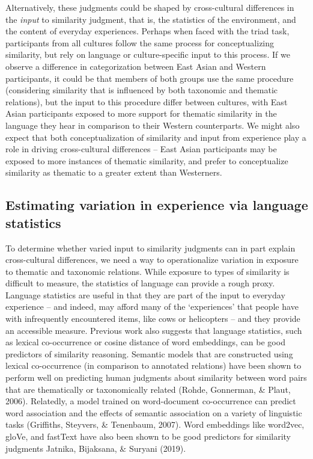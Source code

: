 \documentclass[10pt, letterpaper]{article}
\begin{document}
Alternatively, these judgments could be shaped by cross-cultural
differences in the \emph{input} to similarity judgment, that is, the
statistics of the environment, and the content of everyday experiences.
Perhaps when faced with the triad task, participants from all cultures
follow the same process for conceptualizing similarity, but rely on
language or culture-specific input to this process. If we observe a
difference in categorization between East Asian and Western
participants, it could be that members of both groups use the same
procedure (considering similarity that is influenced by both taxonomic
and thematic relations), but the input to this procedure differ between
cultures, with East Asian participants exposed to more support for
thematic similarity in the language they hear in comparison to their
Western counterparts. We might also expect that both conceptualization
of similarity and input from experience play a role in driving
cross-cultural differences -- East Asian participants may be exposed to
more instances of thematic similarity, and prefer to conceptualize
similarity as thematic to a greater extent than Westerners.

\hypertarget{estimating-variation-in-experience-via-language-statistics}{%
\subsection{Estimating variation in experience via language
statistics}\label{estimating-variation-in-experience-via-language-statistics}}

To determine whether varied input to similarity judgments can in part
explain cross-cultural differences, we need a way to operationalize
variation in exposure to thematic and taxonomic relations. While
exposure to types of similarity is difficult to measure, the statistics
of language can provide a rough proxy. Language statistics are useful in
that they are part of the input to everyday experience -- and indeed,
may afford many of the `experiences' that people have with infrequently
encountered items, like cows or helicopters -- and they provide an
accessible measure. Previous work also suggests that language
statistics, such as lexical co-occurrence or cosine distance of word
embeddings, can be good predictors of similarity reasoning. Semantic
models that are constructed using lexical co-occurrence (in comparison
to annotated relations) have been shown to perform well on predicting
human judgments about similarity between word pairs that are
thematically or taxonomically related (Rohde, Gonnerman, \& Plaut,
2006). Relatedly, a model trained on word-document co-occurrence can
predict word association and the effects of semantic association on a
variety of linguistic tasks (Griffiths, Steyvers, \& Tenenbaum, 2007).
Word embeddings like word2vec, gloVe, and fastText have also been shown
to be good predictors for similarity judgments Jatnika, Bijaksana, \&
Suryani (2019).
\end{document}
